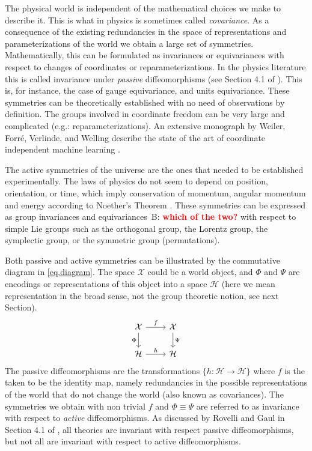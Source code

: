 \documentclass{article}
\newcommand{\bernhard}[1]{~B: \textcolor{red}{\textbf{#1}}}
\begin{document}
The physical world is independent of the mathematical choices we make to describe it. This is what in physics is sometimes called  \emph{covariance}. As a consequence of the existing redundancies in the space of representations and parameterizations of the world we obtain a large set of symmetries. Mathematically, this can be formulated as invariances or equivariances with respect to changes of coordinates or reparameterizations. In the physics literature this is called invariance under \emph{passive} diffeomorphisms (see Section 4.1 of \cite{rovelli2000loop}). This is, for instance, the case of gauge equivariance, and units equivariance. These symmetries can be theoretically established with no need of observations by definition. %
The groups involved in coordinate freedom can be very large and complicated (e.g.: reparameterizations). An extensive monograph by Weiler, Forré, Verlinde, and Welling describe the state of the art of coordinate independent machine learning \cite{weiler}.

The active symmetries of the universe are the ones that needed to be established experimentally. The laws of physics do not seem to depend on position, orientation, or time, which imply conservation of momentum, angular momentum and energy according to Noether's Theorem \cite{noether}. These symmetries can be expressed as group invariances and equivariances\bernhard{which of the two?} with respect to simple Lie groups such as the orthogonal group, the Lorentz group, the symplectic group, or the symmetric group (permutations). 

Both passive and active symmetries can be illustrated by the commutative diagram in \eqref{eq.diagram}. The space $\mathcal X$ could be a world object, and $\Phi$ and $\Psi$ are encodings or representations of this object into a space $\mathcal H$ (here we mean representation in the broad sense, not the group theoretic notion, see next Section).
\begin{equation}\label{eq.diagram}
\begin{tikzcd}[]%
  {\cal X}\arrow[r,"f"] \arrow[d,"\Phi",swap] & {\cal X}  \arrow[d,"\Psi"]\\
{\cal H} \arrow[r,"h"]  & {\cal H} 
\end{tikzcd}
\end{equation}
The passive diffeomorphisms are the transformations $\{h:\mathcal H \to \mathcal H\}$ where $f$ is the taken to be the identity map, namely redundancies in the possible representations of the world that do not change the world (also known as covariances). The symmetries we obtain with non trivial $f$ and $\Phi\equiv \Psi$ are referred to as invariance with respect to \emph{active} diffeomorphisms. As discussed by Rovelli and Gaul in Section 4.1 of \cite{rovelli2000loop}, all theories are invariant with respect passive diffeomorphisms, but not all are invariant with respect to active diffeomorphisms. 
\end{document}
